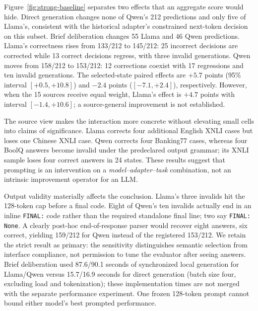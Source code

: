Figure~\ref{fig:strong-baseline} separates two effects that an aggregate score
would hide. Direct generation changes none of Qwen's 212 predictions and only
five of Llama's, consistent with the historical adapter's constrained
next-token decision on this subset. Brief deliberation changes 55 Llama and
46 Qwen predictions. Llama's correctness rises from 133/212 to 145/212:
25 incorrect decisions are corrected while 13 correct decisions regress,
with three invalid generations. Qwen moves from 158/212 to 153/212:
12 corrections coexist with 17 regressions and ten invalid generations.
The selected-state paired effects are $+5.7$ points (95\% interval
$[+0.5,+10.8]$) and $-2.4$ points ($[-7.1,+2.4]$), respectively. However,
when the 15 sources receive equal weight, Llama's effect is $+4.7$ points
with interval $[-1.4,+10.6]$; a source-general improvement is not established.

The source view makes the interaction more concrete without elevating small
cells into claims of significance. Llama corrects four additional English
XNLI cases but loses one Chinese XNLI case. Qwen corrects four Banking77
cases, whereas four BoolQ answers become invalid under the predeclared
output grammar; its XNLI sample loses four correct answers in 24 states.
These results suggest that prompting is an intervention on a
\emph{model--adapter--task} combination, not an intrinsic improvement
operator for an LLM.

Output validity materially affects the conclusion. Llama's three invalids
hit the 128-token cap before a final code. Eight of Qwen's ten invalids
actually end in an inline \texttt{FINAL:} code rather than the required
standalone final line; two say \texttt{FINAL: None}. A clearly post-hoc
end-of-response parser would recover eight answers, six correct, yielding
159/212 for Qwen instead of the registered 153/212. We retain the strict
result as primary: the sensitivity distinguishes semantic selection from
interface compliance, not permission to tune the evaluator after seeing
answers. Brief deliberation used 87.6/90.1 seconds of synchronized local
generation for Llama/Qwen versus 15.7/16.9 seconds for direct generation
(batch size four, excluding load and tokenization); these implementation
times are not merged with the separate performance experiment. One frozen
128-token prompt cannot bound either model's best prompted performance.
\FloatBarrier
